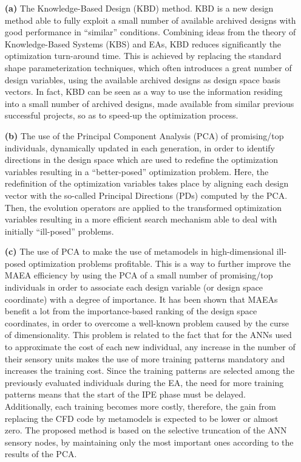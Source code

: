 \begin{itemize}

\item[\textbf{(a)}] The Knowledge-Based Design (KBD) method. KBD is a new design method able to fully exploit a small number of available archived designs with good performance in ``similar” conditions.  Combining ideas from the theory of Knowledge-Based Systems (KBS) and EAs, KBD reduces significantly the optimization turn-around time. This is achieved by replacing the standard shape parameterization techniques, which often introduces a great number of design variables,  using the available archived designs as design space basis vectors.  In fact, KBD can be seen as a way to use the information residing into a small number of archived designs, made available from similar previous successful projects, so as to speed-up the optimization process. 
 
\item[\textbf{(b)}] The use of the Principal Component Analysis (PCA) of promising/top individuals, dynamically updated in each generation, in order to identify directions in the design space which are used to redefine the optimization variables resulting in a ``better-posed'' optimization problem.  Here, the redefinition of the optimization variables takes place by aligning each design vector with the so-called Principal Directions (PDs) computed by the PCA.  Then, the evolution operators are applied to the transformed optimization variables resulting in a more efficient search mechanism able to deal with initially ``ill-posed'' problems. 
 
\item[\textbf{(c)}] The use of PCA to make the use of metamodels in high-dimensional ill-posed optimization problems profitable. This is a way to further improve the MAEA efficiency by using the PCA of a small number of promising/top individuals in order to associate each design variable (or design space coordinate) with a degree of importance. It has been shown that MAEAs  benefit a lot from the importance-based ranking of the design space coordinates, in order to overcome a well-known problem caused by the curse of dimensionality. This problem is related to the fact that for the ANNs used to approximate the cost of each new individual, any increase in the number of their sensory units makes the use of more training patterns mandatory and increases the training cost.  Since the training patterns are selected among the previously evaluated individuals during the EA, the need for more training patterns means that the start of the IPE phase must be delayed. Additionally, each training becomes more costly, therefore, the gain from replacing the CFD code by metamodels is expected to be lower or almost zero. The proposed method is based on the selective truncation of the ANN sensory nodes, by maintaining only the most important ones according to the results of the PCA. 
  

\end{itemize}

